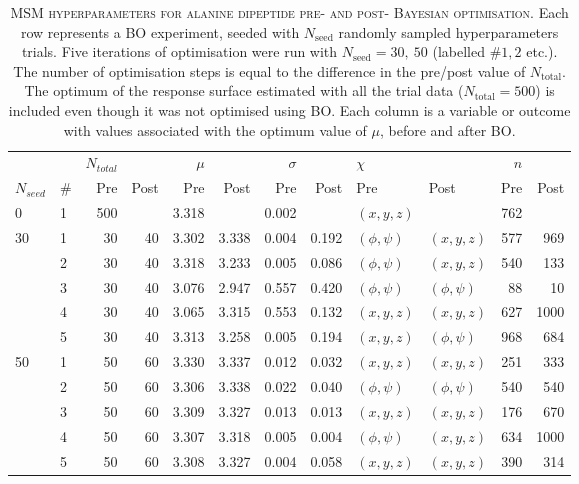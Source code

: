 \begin{table}
    \centering
    \caption[MSM hyperparameters for alanine dipeptide pre- and post- Bayesian optimisation]{\textsc{MSM hyperparameters for alanine dipeptide pre- and post- Bayesian optimisation}.  Each row represents a BO experiment, seeded with $N_{\mathrm{seed}}$ randomly sampled hyperparameters trials. Five iterations of optimisation were run with $N_{\mathrm{seed}}=30,\ 50$ (labelled $\# 1, 2$ etc.). The number of optimisation steps is equal to the difference in the pre/post value of $N_{\mathrm{total}}$.  The optimum of the response surface estimated with all the trial data ($N_{\mathrm{total}}=500$) is included even though it was not optimised using BO. Each column is a variable or outcome with values associated with the optimum value of $\mu$, before and after BO.  
    }
\begin{tabular}{llrrrrrrllrr}
\toprule
   &   & $N_{total}$ & & $\mu$ & & $\sigma$ & & $\chi$ &  & $n$ & \\
 $N_{seed}$  &   \#  &         Pre & Post &   Pre &  Post &      Pre &  Post &  Pre & Post & Pre & Post \\
\midrule
0  & 1 &         500 &      & 3.318 &       &    0.002 &       &     $(x, y, z)$ &              & 762 &      \\
\midrule
30 & 1 &          30 &   40 & 3.302 & 3.338 &    0.004 & 0.192 &  $(\phi, \psi)$ &     $(x, y, z)$ & 577 &  969 \\
   & 2 &          30 &   40 & 3.318 & 3.233 &    0.005 & 0.086 &  $(\phi, \psi)$ &     $(x, y, z)$ & 540 &  133 \\
   & 3 &          30 &   40 & 3.076 & 2.947 &    0.557 & 0.420 &  $(\phi, \psi)$ &  $(\phi, \psi)$ &  88 &   10 \\
   & 4 &          30 &   40 & 3.065 & 3.315 &    0.553 & 0.132 &     $(x, y, z)$ &     $(x, y, z)$ & 627 & 1000 \\
   & 5 &          30 &   40 & 3.313 & 3.258 &    0.005 & 0.194 &     $(x, y, z)$ &  $(\phi, \psi)$ & 968 &  684 \\
   \midrule
50 & 1 &          50 &   60 & 3.330 & 3.337 &    0.012 & 0.032 &     $(x, y, z)$ &     $(x, y, z)$ & 251 &  333 \\
   & 2 &          50 &   60 & 3.306 & 3.338 &    0.022 & 0.040 &  $(\phi, \psi)$ &  $(\phi, \psi)$ & 540 &  540 \\
   & 3 &          50 &   60 & 3.309 & 3.327 &    0.013 & 0.013 &     $(x, y, z)$ &     $(x, y, z)$ & 176 &  670 \\
   & 4 &          50 &   60 & 3.307 & 3.318 &    0.005 & 0.004 &  $(\phi, \psi)$ &     $(x, y, z)$ & 634 & 1000 \\
   & 5 &          50 &   60 & 3.308 & 3.327 &    0.004 & 0.058 &     $(x, y, z)$ &     $(x, y, z)$ & 390 &  314 \\
\bottomrule
\end{tabular}\label{tab:ala1_best_params}
\end{table}

